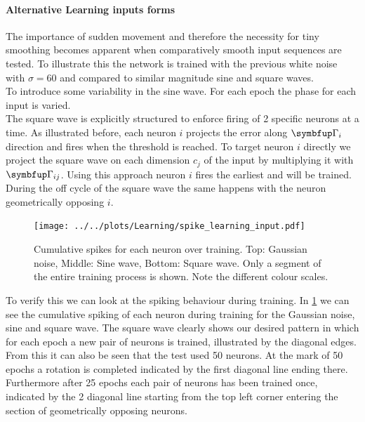 \paragraph{Alternative Learning inputs forms}
The importance of sudden movement and therefore the necessity for tiny smoothing becomes apparent when comparatively smooth input sequences are tested. To illustrate this the network is trained with the previous white noise with $\sigma = 60$ and compared to similar magnitude sine and square waves.\\
To introduce some variability in the sine wave. For each epoch the phase for each input is varied.\\
The square wave is explicitly structured to enforce firing of 2 specific neurons at a time. As illustrated before, each neuron $i$ projects the error along $\bmu{\Gamma}_i$ direction and fires when the threshold is reached. To target neuron $i$ directly we project the square wave on each dimension $c_j$ of the input by multiplying it with $\bmu{\Gamma}_{ij}$. Using this approach neuron $i$ fires the earliest and will be trained. During the off cycle of the square wave the same happens with the neuron geometrically opposing $i$.\\
\begin{figure}
	\centering
	\texttt{[image: ../../plots/Learning/spike\_learning\_input.pdf]}
	\caption{Cumulative spikes for each neuron over training. Top: Gaussian noise, Middle: Sine wave, Bottom: Square wave. Only a segment of the entire training process is shown. Note the different colour scales.}
	\label{fig:spike_learning_input}
\end{figure}
To verify this we can look at the spiking behaviour during training. In \cref{fig:spike_learning_input} we can see the cumulative spiking of each neuron during training for the Gaussian noise, sine and square wave. The square wave clearly shows our desired pattern in which for each epoch a new pair of neurons is trained, illustrated by the diagonal edges. From this it can also be seen that the test used 50 neurons. At the mark of 50 epochs a rotation is completed indicated by the first diagonal line ending there. Furthermore after 25 epochs each pair of neurons has been trained once, indicated by the 2 diagonal line starting from the top left corner entering the section of geometrically opposing neurons.\\
